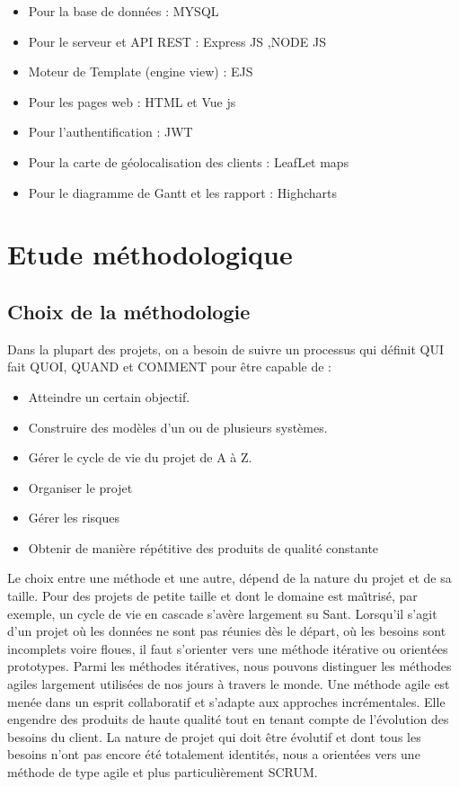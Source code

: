 \begin{itemize}

\item{Pour la base de donn\'{e}es : MYSQL}
\item{Pour le serveur et API REST : Express JS ,NODE JS}
\item{Moteur de Template (engine view) : EJS }
\item{Pour les pages web : HTML et Vue js}
\item{Pour l'authentification : JWT }
\item{Pour la carte de g\'{e}olocalisation des clients : LeafLet maps}
\item{Pour le diagramme de Gantt et les rapport : Highcharts}

\end{itemize}

\section{ Etude m\'{e}thodologique }



  \subsection{Choix de la   m\'{e}thodologie}

  Dans la plupart des projets, on a besoin de suivre un processus qui d\'{e}finit
QUI fait QUOI, QUAND et COMMENT pour \^{e}tre capable de :

\begin{itemize}
\item{Atteindre un certain objectif.}
\item{Construire des mod\`{e}les d'un ou de plusieurs syst\`{e}mes.}
\item{G\'{e}rer le cycle de vie du projet de A \`{a} Z.}
\item{Organiser le projet}
\item{G\'{e}rer les risques}
\item{Obtenir de mani\`{e}re r\'{e}p\'{e}titive des produits de qualit\'{e} constante}
\end{itemize}

Le choix entre une m\'{e}thode et une autre, d\'{e}pend de la nature du projet et de sa taille. Pour des
projets de petite taille et dont le domaine est ma\^{\i}tris\'{e}, par exemple, un cycle de vie en cascade
s'av\`{e}re largement su Sant. Lorsqu'il s'agit d'un projet o\`{u} les donn\'{e}es ne sont pas r\'{e}unies d\`{e}s le
d\'{e}part, o\`{u} les besoins sont incomplets voire floues, il faut s'orienter vers une m\'{e}thode it\'{e}rative
ou orient\'{e}es prototypes.
Parmi les m\'{e}thodes it\'{e}ratives, nous pouvons distinguer les m\'{e}thodes agiles largement utilis\'{e}es
de nos jours \`{a} travers le monde. Une m\'{e}thode agile est men\'{e}e dans un esprit collaboratif et
s'adapte aux approches incr\'{e}mentales. Elle engendre des produits de haute qualit\'{e} tout en tenant
compte de l'\'{e}volution des besoins du client.
La nature de projet qui doit \^{e}tre \'{e}volutif et dont tous les besoins n'ont pas encore \'{e}t\'{e}
totalement identit\'{e}s, nous a orient\'{e}es vers une m\'{e}thode de type agile et plus particuli\`{e}rement
SCRUM.
